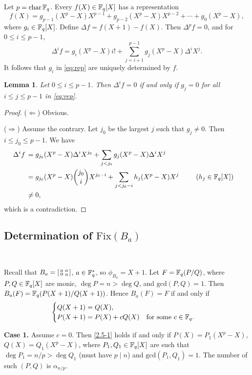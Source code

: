 \documentclass{amsart}
\newtheorem{lem}[thm]{Lemma}
\numberwithin{equation}{section}
\theoremstyle{definition}
\newcommand{\f}{\Bbb F}
\begin{document}
Let $p=\text{char}\,\f_q$.
Every $f(X)\in\f_q[X]$ has a representation 
\begin{equation}\label{eq:rep}
f(X)=g_{p-1}(X^p-X)X^{p-1}+g_{p-2}(X^p-X)X^{p-2}+\cdots+g_0(X^p-X),
\end{equation}
where $g_i\in\f_q[X]$. Define $\Delta f=f(X+1)-f(X)$. Then $\Delta^pf=0$, and for $0\le i\le p-1$,
\[
\Delta^if=g_i(X^p-X)i!+\sum_{j=i+1}^{p-1}g_j(X^p-X)\Delta^iX^j.
\]
It follows that $g_i$ in \eqref{eq:rep} are uniquely determined by $f$.

\begin{lem}\label{LA8}
Let $0\le i\le p-1$. Then $\Delta^if=0$ if and only if $g_j=0$ for all $i\le j\le p-1$ in \eqref{eq:rep}.
\end{lem}

\begin{proof}
($\Leftarrow$) Obvious.

\medskip
($\Rightarrow$) Assume the contrary. Let $j_0$ be the largest $j$ such that $g_j\ne 0$. Then $i\le j_0\le p-1$. We have
\begin{align*}
\Delta^if\,&=g_{j_0}(X^p-X)\Delta^iX^{j_0}+\sum_{j<j_0}g_j(X^p-X)\Delta^iX^j\cr
&=g_{j_0}(X^p-X)\binom{j_0}iX^{j_0-i}+\sum_{j<j_0-i}h_j(X^p-X)X^j\kern2.5em(h_j\in\f_q[X])\cr
&\ne 0,
\end{align*}
which is a contradiction.
\end{proof}

\subsection{Determination of $\text{Fix}(B_a)$}\

Recall that $B_a=\left[\begin{smallmatrix}a&a\cr 0&a\end{smallmatrix}\right]$, $a\in\f_q^*$, so $\phi_{B_a}=X+1$. Let $F=\f_q(P/Q)$, where $P,Q\in\f_q[X]$ are monic, $\deg P=n>\deg Q$, and $\text{gcd}(P,Q)=1$. Then $B_a(F)=\f_q(P(X+1)/Q(X+1))$. Hence $B_a(F)=F$ if and only if
\begin{equation}\label{2.5-1}
\begin{cases}
Q(X+1)=Q(X),\cr
P(X+1)=P(X)+cQ(X)\quad \text{for some}\ c\in\f_q.
\end{cases}
\end{equation}

\medskip
{\bf Case 1.} Assume $c=0$. Then \eqref{2.5-1} holds if and only if $P(X)=P_1(X^p-X)$, $Q(X)=Q_1(X^p-X)$, where $P_1,Q_1\in\f_q[X]$ are such that $\deg P_1=n/p>\deg Q_1$ (must have $p\mid n$) and $\text{gcd}(P_1,Q_1)=1$. The number of such $(P,Q)$ is $\alpha_{n/p}$.
\end{document}
